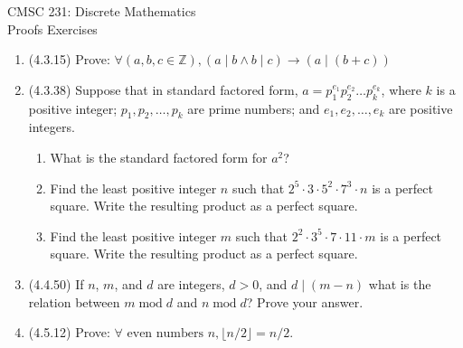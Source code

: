 \documentclass{article}
\newcommand{\bz}{\mathbb{Z}}
\newcommand{\AND}{\wedge}
\newcommand{\di}{\mathrel{|}}
\begin{document}
\begin{center}
CMSC 231: Discrete Mathematics\\
Proofs Exercises
\end{center}

\begin{enumerate}[itemsep=2ex]
\item (4.3.15) Prove: $\forall (a,b,c \in \bz), (a \di b \AND b \di c) \to (a \di (b+c))$

\item (4.3.38) Suppose that in standard factored form, $a = p_1^{e_1} p_2^{e_2} \dots p_k^{e_k}$,
where $k$ is a positive integer; $p_1, p_2, \ldots, p_k$ are prime numbers; and $e_1, e_2, \ldots, e_k$ are positive integers.
\begin{enumerate}
\item What is the standard factored form for $a^2$?
\item Find the least positive integer $n$ such that $2^5\cdot 3 \cdot 5^2 \cdot 7^3 \cdot n$ is a perfect square. Write the resulting product as a perfect square.
\item Find the least positive integer $m$ such that $2^2 \cdot 3^5 \cdot 7 \cdot 11 \cdot m$ is
a perfect square. Write the resulting product as a perfect square.
\end{enumerate}

\item (4.4.50) If $n$, $m$, and $d$ are integers, $d > 0$, and $d \di (m - n)$ what is
the relation between $m \mathop{mod} d$ and $n \mathop{mod} d$? Prove your answer.

\item (4.5.12) Prove: $\forall \text{ even numbers } n, \lfloor n/2 \rfloor = n /2$.

\end{enumerate}
\end{document}
